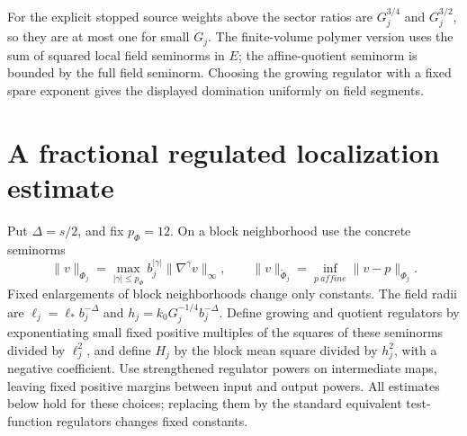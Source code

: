 \documentclass[11pt]{article}
\begin{document}
For the explicit stopped source weights above the sector ratios are
\(G_j^{3/4}\) and \(G_j^{3/2}\), so they are at most one for small
\(G_j\). The finite-volume polymer version uses the sum of squared
local field seminorms in \(E\); the affine-quotient seminorm is bounded
by the full field seminorm. Choosing the growing regulator with a fixed
spare exponent gives the displayed domination uniformly on field segments.

\section{A fractional regulated localization estimate}
\label{completion:regulated-localization}
Put \(\Delta=s/2\), and fix \(p_\Phi=12\). On a block
neighborhood use the concrete seminorms
\[
 \|v\|_{\Phi_j}=\max_{|\gamma|\le p_\Phi}
                      b_j^{|\gamma|}\|\nabla^\gamma v\|_\infty,
 \qquad
 \|v\|_{\widetilde\Phi_j}=\inf_{p\ {
 affine}}\|v-p\|_{\Phi_j}.
\]
Fixed enlargements of block neighborhoods change only constants.
The field radii are \(\ell_j=\ell_*b_j^{-\Delta}\) and
\(h_j=k_0G_j^{-1/4}b_j^{-\Delta}\). Define growing and quotient
regulators by exponentiating small fixed positive multiples of the
squares of these seminorms divided by \(\ell_j^2\), and define
\(H_j\) by the block mean square divided by \(h_j^2\), with a
negative coefficient. Use strengthened regulator powers on intermediate
maps, leaving fixed positive margins between input and output powers.
All estimates below hold for these choices; replacing them by the
standard equivalent test-function regulators changes fixed constants.
\end{document}
